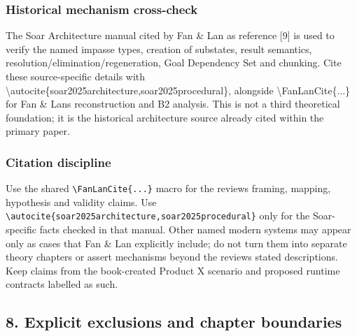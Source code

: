\subsubsection{Historical mechanism cross-check}\label{historical-mechanism-cross-check}

The Soar Architecture manual cited by Fan \& Lan as reference {[}9{]} is used to verify the named impasse types, creation of substates, result semantics, resolution/elimination/regeneration, Goal Dependency Set and chunking. Cite these source-specific details with \textbackslash autocite\{soar2025architecture,soar2025procedural\}, alongside \textbackslash FanLanCite\{...\} for Fan \& Lan\textquotesingle s reconstruction and B2 analysis. This is not a third theoretical foundation; it is the historical architecture source already cited within the primary paper.

\subsubsection{Citation discipline}\label{citation-discipline}

Use the shared \texttt{\textbackslash{}FanLanCite\{...\}} macro for the review\textquotesingle s framing, mapping, hypothesis and validity claims. Use \texttt{\textbackslash{}autocite\{soar2025architecture,soar2025procedural\}} only for the Soar-specific facts checked in that manual. Other named modern systems may appear only as cases that Fan \& Lan explicitly include; do not turn them into separate theory chapters or assert mechanisms beyond the review\textquotesingle s stated descriptions. Keep claims from the book-created Product X scenario and proposed runtime contracts labelled as such.

\subsection{8. Explicit exclusions and chapter boundaries}\label{8-explicit-exclusions-and-chapter-boundaries}


